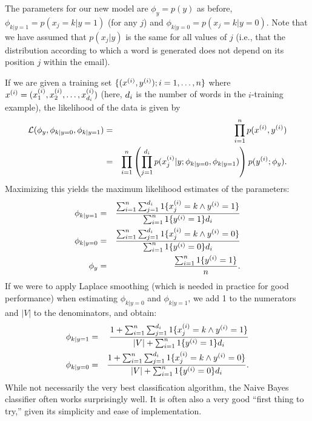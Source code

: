 \documentclass{article}
\begin{document}
The parameters for our new model are $\phi_y = p(y)$ as before,
$\phi_{k|y=1} = p(x_j=k|y=1)$ (for any $j$)
and $\phi_{k|y=0} = p(x_j=k|y=0)$.
Note that we have assumed that $p(x_j|y)$ is the same for all values of $j$ (i.e., that the
distribution according to which a word is generated does not depend on its position $j$
within the email).

If we are given a training set
$\{({x^{(i)}}, {y^{(i)}}); i=1,\ldots,{n}\}$ where ${x^{(i)}} =
(x^{(i)}_1, x^{(i)}_2, \ldots, x^{(i)}_{{d}_i})$ (here, ${{d}}_i$ is the number of words in the $i$-training
example), the likelihood of the data is given by
\begin{eqnarray*}
{\cal L}(\phi_y, \phi_{k|y=0}, \phi_{k|y=1}) &=& \prod_{i=1}^{n} p({x^{(i)}}, {y^{(i)}}) \\
&=& \prod_{i=1}^{n} \left(\prod_{j=1}^{{d}_i} p(x^{(i)}_j|y ;  \phi_{k|y=0}, \phi_{k|y=1}) \right) p({y^{(i)}} ; \phi_y).
\end{eqnarray*}
Maximizing this yields the maximum likelihood estimates of the parameters:
\begin{eqnarray*}
\phi_{k|y=1} &=& \frac{\sum_{i=1}^{n} \sum_{j=1}^{{d}_i} 1\{x_j^{(i)} = k \wedge {y^{(i)}} = 1\}}{\sum_{i=1}^{n} 1\{{y^{(i)}}=1\}{{d}}_i} \\
\phi_{k|y=0} &=& \frac{\sum_{i=1}^{n} \sum_{j=1}^{{d}_i} 1\{x_j^{(i)} = k \wedge {y^{(i)}} = 0\}}{\sum_{i=1}^{n} 1\{{y^{(i)}}=0\}{{d}}_i}\\
\phi_y &=& \frac{\sum_{i=1}^{n} 1\{{y^{(i)}} = 1\}}{{n}}.
\end{eqnarray*}
If we were to apply Laplace smoothing (which is needed in practice for good performance) when
estimating $\phi_{k|y=0}$ and $\phi_{k|y=1}$, we add 1 to the numerators and $|V|$ to the
denominators, and obtain:
\begin{eqnarray*}
       \phi_{k|y=1} &=& \frac{1 + \sum_{i=1}^{n} \sum_{j=1}^{{d}_i} 1\{x_j^{(i)} = k \wedge {y^{(i)}} = 1\}}{|V| + \sum_{i=1}^{n} 1\{{y^{(i)}}=1\}{{d}}_i} \\
       \phi_{k|y=0} &=& \frac{1 + \sum_{i=1}^{n} \sum_{j=1}^{{d}_i} 1\{x_j^{(i)} = k \wedge {y^{(i)}} = 0\}}{|V| + \sum_{i=1}^{n} 1\{{y^{(i)}}=0\}{{d}}_i}.
\end{eqnarray*}
While not necessarily the very best classification algorithm, the Naive Bayes classifier
often works surprisingly well.  It is often also a very good ``first thing to try,''
given its simplicity and ease of implementation.

\end{document}
